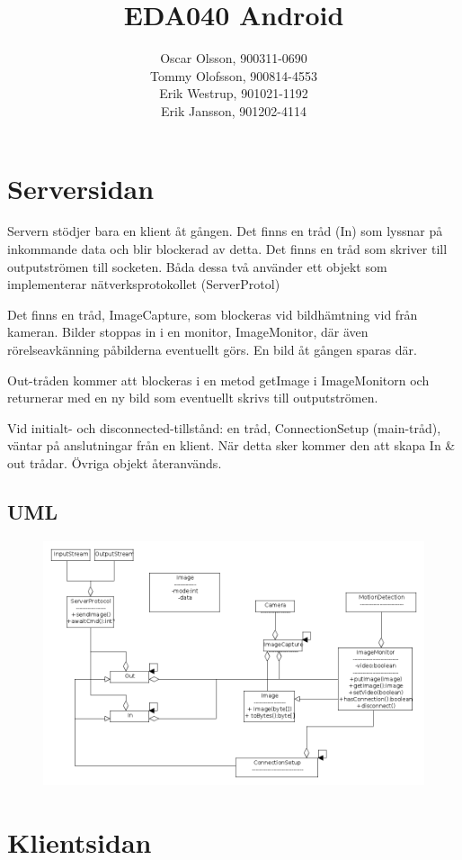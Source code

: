 \documentclass[a4paper]{article}
\title{EDA040 Android}
\date{}
\author{Oscar Olsson, 900311-0690\\ Tommy Olofsson, 900814-4553\\
	Erik Westrup, 901021-1192\\ Erik Jansson, 901202-4114}
\begin{document}
\maketitle

\section{Serversidan}
Servern stödjer bara en klient åt gången. Det finns en tråd (In) som lyssnar på inkommande data och blir blockerad av detta. Det finns en tråd som skriver till outputströmen till socketen. Båda dessa två använder ett objekt som implementerar nätverksprotokollet (ServerProtol) 

Det finns en tråd, ImageCapture, som blockeras vid bildhämtning vid från kameran. Bilder stoppas in i en monitor, ImageMonitor, där även rörelseavkänning påbilderna eventuellt görs. En bild åt gången sparas där.

Out-tråden kommer att blockeras i en metod getImage i ImageMonitorn och returnerar med en ny bild som eventuellt skrivs till outputströmen.

Vid initialt- och disconnected-tillstånd: en tråd, ConnectionSetup (main-tråd), väntar på anslutningar från en klient. När detta sker kommer den att skapa In \& out trådar. Övriga objekt återanvänds.

\newpage
\subsection{UML}
\begin{figure}[htb]
\includegraphics[scale=0.4]{uml_server.png}
\end{figure}

\section{Klientsidan}
\end{document}
